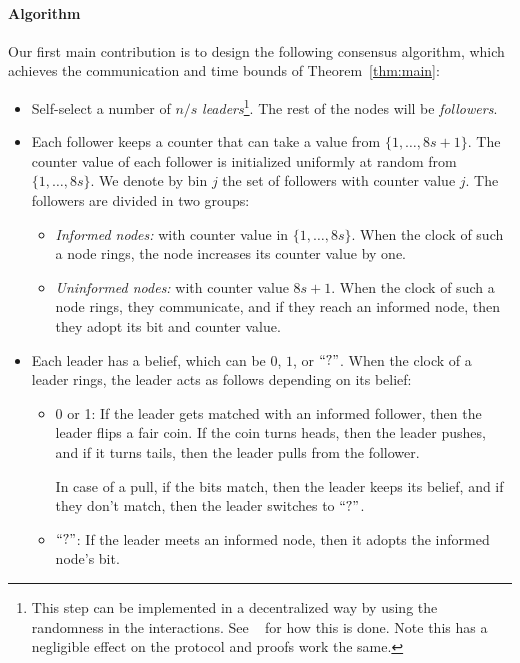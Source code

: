 \documentclass[a4paper,12pt]{article}
\newcommand{\q}{$``?"$}
\begin{document}
\paragraph{Algorithm} %
Our first main contribution is to design the following consensus algorithm, which achieves the communication and time bounds of Theorem~\ref{thm:main}:


\begin{itemize}
	\item Self-select a number of $n/s$ \emph{leaders}\footnote{This step can be implemented in a decentralized way by using the randomness in the interactions. See ~\cite{comm_init} for how this is done. Note this has a negligible effect on the protocol and proofs work the same.}. The rest of the nodes will be \emph{followers}.
	\item Each follower keeps a counter that can take a value from $\{1, \ldots, 8 s+1\}$. The counter value of each follower is initialized uniformly at random from $\{1, \ldots, 8s\}$. We denote by bin $j$ the set of followers with counter value $j$.
	The followers are divided in two groups:
	\begin{itemize}
		\item \emph{Informed nodes:} with counter value in $\{1, \ldots, 8 s \}$. When the clock of such a node rings, the node increases its counter value by one.
		\item \emph{Uninformed nodes:} with counter value $8 s+1$. When the clock of such a node rings, they communicate, and if they reach an informed node, then they adopt its bit and counter value.
	\end{itemize}
	\item Each leader has a belief, which can be $0$, $1$, or \q. When the clock of a leader rings, the leader acts as follows depending on its belief:
	\begin{itemize}
		\item 0 or 1: If the leader gets matched with an informed follower, then the leader flips a fair coin. If the coin turns heads, then the leader pushes, and if it turns tails, then the leader pulls from the follower.
		
		In case of a pull, if the bits match, then the leader keeps its belief, and if they don't match, then the leader switches to \q.
		
		\item \q: If the leader meets an informed node, then it adopts the informed node's bit.
	\end{itemize}
\end{itemize}
\end{document}
